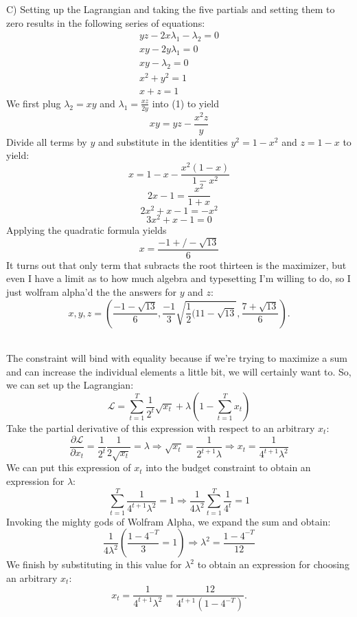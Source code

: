 \documentclass[12pt,leqno]{article}
\newcommand{\lgrange}{\mathscr{L}}
\begin{document}
\bigskip
\indent C) Setting up the Lagrangian and taking the five partials and setting them to zero results in the following series of equations:
\begin{eqnarray}
yz - 2x\lambda_1 - \lambda_2 = 0 \\
xy - 2y\lambda_1 = 0 \\
xy - \lambda_2 = 0\\
x^2 + y^2 = 1 \\
x + z = 1
\end{eqnarray}
We first plug $\lambda_2 = xy$ and $\lambda_1 =\frac{xz}{2y}$ into (1) to yield
$$xy = yz - \frac{x^2z}{y}$$
Divide all terms by $y$ and substitute in the identities $y^2 = 1- x^2$ and $z = 1-x$ to yield:
$$x = 1-x - \frac{x^2(1-x)}{1-x^2}$$
$$2x - 1 = \frac{x^2}{1+x}$$
$$2x^2 + x - 1 = -x^2$$
$$3x^2 + x - 1 = 0$$
Applying the quadratic formula yields
$$x = \frac{-1 +/- \sqrt{13}}{6}$$
It turns out that only term that subracts the root thirteen is the maximizer, but even I have a limit as to how much algebra and typesetting I'm willing to do, so I just wolfram alpha'd the the answers for $y$ and $z$: 
$$x, y, z = \left(\frac{-1-\sqrt{13}}{6},\frac{-1}{3}\sqrt{\frac{1}{2}(11-\sqrt{13}}, \frac{7 + \sqrt{13}}{6}\right).$$



\bigskip
{}\\
\indent The constraint will bind with equality because if we're trying to maximize a sum and can increase the individual elements a little bit, we will certainly want to. So, we can set up the Lagrangian:
$$\lgrange = \sum^T_{t=1} \frac{1}{2^t}\sqrt{x_t} + \lambda\left(1 - \sum^T_{t=1}x_t\right)$$
Take the partial derivative of this expression with respect to an arbitrary $x_t$:
$$\frac{\partial \lgrange}{\partial x_t} = \frac{1}{2^t}\frac{1}{2\sqrt{x_t}} = \lambda \Longrightarrow \sqrt{x_t} = \frac{1}{2^{t+1}\lambda} \Longrightarrow x_t = \frac{1}{4^{t+1}\lambda^2}$$
We can put this expression of $x_t$ into the budget constraint to obtain an expression for $\lambda$:
$$\sum^T_{t=1} \frac{1}{4^{t+1}\lambda^2} = 1 \Longrightarrow \frac{1}{4 \lambda^2} \sum^T_{t=1} \frac{1}{4^t} = 1$$
Invoking the mighty gods of Wolfram Alpha, we expand the sum and obtain:
$$\frac{1}{4\lambda^2}\left(\frac{1 - 4^{-T}}{3} = 1\right) \Longrightarrow \lambda^2 = \frac{1 - 4^{-T}}{12}$$
We finish by substituting in this value for $\lambda^2$ to obtain an expression for choosing an arbitrary $x_t$:
$$x_t = \frac{1}{4^{t+1}\lambda^2} = \frac{12}{4^{t+1}(1 - 4^{-T})}.$$
\end{document}
